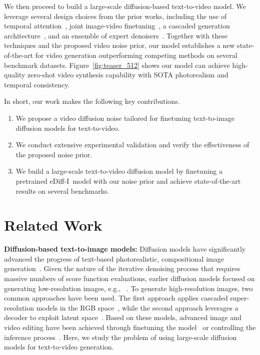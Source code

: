 \documentclass[10pt,twocolumn,letterpaper]{article}
\newcommand{\ediffi}{eDiff-I\xspace}
\begin{document}
We then proceed to build a large-scale diffusion-based text-to-video model. We leverage several design choices from the prior works, including the use of temporal attention~\cite{ho2022video}, joint image-video finetuning~\cite{ho2022video}, a cascaded generation architecture~\cite{ho2022imagen}, and an ensemble of
expert denoisers~\cite{balaji2022ediffi}. Together with these techniques and the proposed video noise prior, our model establishes a new state-of-the-art for video generation outperforming competing methods on several benchmark datasets. Figure~\ref{fig:teaser_512} shows our model can achieve high-quality zero-shot video synthesis capability with SOTA photorealism and temporal consistency.

In short, our work makes the following key contributions.

\begin{enumerate}[leftmargin=8pt]
    \setlength\itemsep{0em}
    \item We propose a video diffusion noise tailored for finetuning text-to-image diffusion models for text-to-video.
    \item We conduct extensive experimental validation and verify the effectiveness of the proposed noise prior.
    \item We build a large-scale text-to-video diffusion model by finetuning a pretrained \ediffi~model with our noise prior and achieve state-of-the-art results on several benchmarks.
\end{enumerate}

 
\section{Related Work}\label{sec:related_work}


\textbf{Diffusion-based text-to-image models: } Diffusion models have significantly advanced the progress of text-based photorealistic, compositional image generation~\cite{ramesh2022hierarchical,saharia2022photorealistic}. Given the nature of the iterative denoising process that requires massive numbers of score function evaluations, earlier diffusion models focused on generating low-resolution images, e.g., ~\cite{ho2020denoising,song2021denoising}. To generate high-resolution images, two common approaches have been used. The first approach applies cascaded super-resolution models in the RGB space~\cite{nichol2021glide,ho2022cascaded,saharia2022photorealistic,ramesh2022hierarchical}, while the second approach leverages a decoder to exploit latent space~\cite{rombach2022high,gu2022vector}. Based on these models, advanced image and video editing have been achieved through finetuning the model~\cite{ruiz2022dreambooth,zhang2023adding,brooks2022instructpix2pix,kumari2022multi,wu2022tune,ma2023follow} or controlling the inference process~\cite{meng2022sdedit,hertz2022prompt,parmar2023zero,ge2023expressive,qi2023fatezero,ceylan2023pix2video,molad2023dreamix,bar2022text2live}. Here, we study the problem of using large-scale diffusion models for text-to-video generation. 
\end{document}
